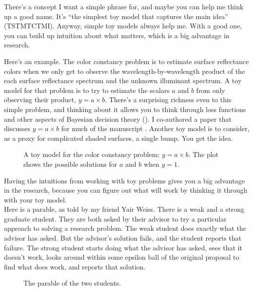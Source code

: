 There's a concept I want a
  simple phrase for, and maybe you can help me think up a good name.
  It's ``the simplest toy model that captures the main
  idea''  (TSTMTCTMI).    Anyway, simple toy models
 always help me.  With a good one, 
  you can build up intuition about what matters, which is a big
  advantage in research.  

Here's an example.  The color constancy problem is to estimate surface
reflectance colors when we only get to observe the
wavelength-by-wavelength product of the each surface
reflectance spectrum and the unknown
illuminant spectrum.  A toy model for that problem is to try to estimate the scalars
$a$ and $b$ from only observing their product, $y = a \times b$.  There's a
surprising richness even to this simple problem, and thinking about it
allows you to think through loss functions and other aspects of
Bayesian decision theory (\fig{\ref{fig:toy}}).  I co-authored a paper that discusses 
$y = a \times b$ for much of the manuscript \cite{Freeman95a}.
Another toy model is to consider,  as a proxy for complicated shaded surfaces, a
single bump.  You get the idea.
\begin{figure}[h]
\centerline{
}
\caption{A toy model for the color constancy problem:  $y = a \times b$. The plot shows the possible solutions for $a$ and $b$ when $y=1$.}
\label{fig:toy}
\end{figure}

Having the intuitions from working with toy problems gives you a big advantage in the research, because you can figure out what will work by thinking it through with your toy model. \\

  Here is a parable, as told by my friend Yair Weiss.  There is a weak
and a strong graduate student.  They are both asked by their advisor
to try a particular approach to solving a research problem.
The weak student does exactly what the advisor has asked.  But the advisor's
solution fails, and the student reports that failure.
The strong student starts doing what the advisor has asked, sees that
it doesn't work, looks around within some epsilon ball
of the original proposal to find what does work, and reports that solution.
\begin{figure}[htpb!]
\centerline{
}
\caption{The parable of the two students.}
\label{fig:students}
\end{figure}


